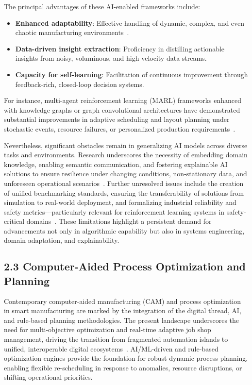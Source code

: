 \documentclass[11pt]{article}
\begin{document}
The principal advantages of these AI-enabled frameworks include:

\begin{itemize}
    \item \textbf{Enhanced adaptability}: Effective handling of dynamic, complex, and even chaotic manufacturing environments~\cite{ref13,ref19}.
    \item \textbf{Data-driven insight extraction}: Proficiency in distilling actionable insights from noisy, voluminous, and high-velocity data streams.
    \item \textbf{Capacity for self-learning}: Facilitation of continuous improvement through feedback-rich, closed-loop decision systems.
\end{itemize}

For instance, multi-agent reinforcement learning (MARL) frameworks enhanced with knowledge graphs or graph convolutional architectures have demonstrated substantial improvements in adaptive scheduling and layout planning under stochastic events, resource failures, or personalized production requirements~\cite{ref27,ref37}.

Nevertheless, significant obstacles remain in generalizing AI models across diverse tasks and environments. Research underscores the necessity of embedding domain knowledge, enabling semantic communication, and fostering explainable AI solutions to ensure resilience under changing conditions, non-stationary data, and unforeseen operational scenarios~\cite{ref37,ref41}. Further unresolved issues include the creation of unified benchmarking standards, ensuring the transferability of solutions from simulation to real-world deployment, and formalizing industrial reliability and safety metrics—particularly relevant for reinforcement learning systems in safety-critical domains~\cite{ref38}. These limitations highlight a persistent demand for advancements not only in algorithmic capability but also in systems engineering, domain adaptation, and explainability.

\subsection{2.3 Computer-Aided Process Optimization and Planning}

Contemporary computer-aided manufacturing (CAM) and process optimization in smart manufacturing are marked by the integration of the digital thread, AI, and rule-based planning methodologies. The present landscape underscores the need for multi-objective optimization and real-time adaptive job shop management, driving the transition from fragmented automation islands to unified, interoperable digital ecosystems~\cite{ref4,ref11,ref16,ref18,ref19,ref20,ref27,ref28,ref29,ref30,ref38,ref44,ref45,ref49,ref51,ref55,ref59,ref60,ref61,ref70}. AI/ML-driven and rule-based optimization engines provide the foundation for robust dynamic process planning, enabling flexible re-scheduling in response to anomalies, resource disruptions, or shifting operational priorities.
\end{document}
